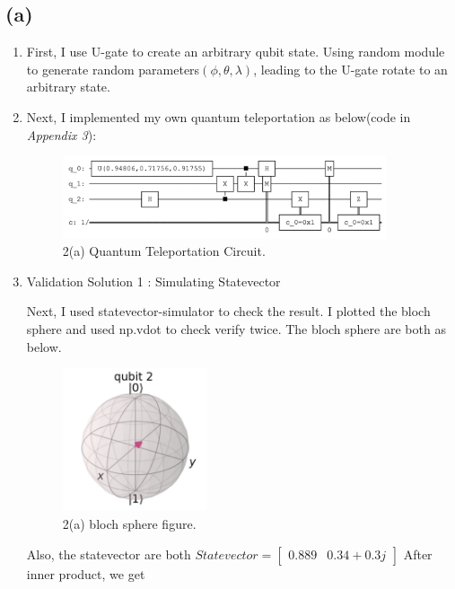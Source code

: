 \documentclass{article}
\begin{document}
\begin{CJK*}{UTF8}{bsmi}
\subsection{(a)} 
\begin{enumerate}
    \item First, I use U-gate to create an arbitrary qubit state. Using random module to generate random parameters$(\phi, \theta, \lambda)$, leading to the U-gate rotate to an arbitrary state.
    \item Next, I implemented my own quantum teleportation as below(code in \emph {Appendix 3}):
    \begin{figure}[h]
    \centering
    \includegraphics[width=0.9\textwidth]{qtele.png}
    \caption{\label{fig:qtele}2(a) Quantum Teleportation Circuit.}
    \end{figure}
   
   \item Validation Solution 1 : Simulating Statevector
   
   Next, I used statevector-simulator to check the result. I plotted the bloch sphere and used np.vdot to check verify twice. The bloch sphere are both as below.
    \begin{figure}[h]
    \centering
    \includegraphics[width=0.4\textwidth]{2asol1.png}
    \caption{\label{fig:2asol1}2(a) bloch sphere figure.}
    \end{figure}
   
    Also, the statevector are both  $Statevector =\begin{bmatrix}
    0.889 & 0.34+0.3j 
    \end{bmatrix} $
    After inner product, we get
    

\end{enumerate}
\end{CJK*}
\end{document}
